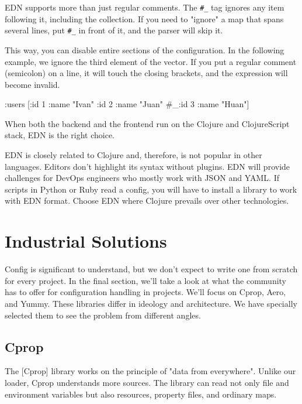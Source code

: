 EDN supports more than just regular comments. The \verb|#_| tag ignores any item following it, including the collection. If you need to "ignore" a map that spans several lines, put \verb|#_| in front of it, and the parser will skip it.


This way, you can disable entire sections of the configuration. In the following example, we ignore the third element of the vector. If you put a regular comment (semicolon) on a line, it will touch the closing brackets, and the expression will become invalid.

\begin{clojure}
{:users [{:id 1 :name "Ivan"}
         {:id 2 :name "Juan"}
         #_{:id 3 :name "Huan"}]}
\end{clojure}

When both the backend and the frontend run on the Clojure and ClojureScript stack, EDN is the right choice.

EDN is closely related to Clojure and, therefore, is not popular in other languages. Editors don't highlight its syntax without plugins. EDN will provide challenges for DevOps engineers who mostly work with JSON and YAML. If scripts in Python or Ruby read a config, you will have to install a library to work with EDN format. Choose EDN where Clojure prevails over other technologies.

\section{Industrial Solutions}

Config is significant to understand, but we don't expect to write one from scratch for every project. In the final section, we'll take a look at what the community has to offer for configuration handling in projects. We'll focus on Cprop, Aero, and Yummy. These libraries differ in ideology and architecture. We have specially selected them to see the problem from different angles.

\subsection{Cprop}


The [Cprop] library works on the principle of "data from everywhere". Unlike our loader, Cprop understands more sources. The library can read not only file and environment variables but also resources, property files, and ordinary maps.

